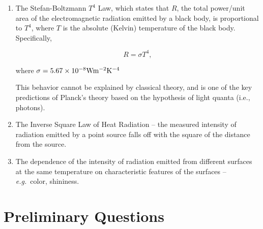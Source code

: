 \documentclass{article}
\begin{document}
\begin{enumerate}
\item The Stefan-Boltzmann $T^4$ Law, which states
that $R$, the total power/unit area of the electromagnetic radiation
emitted by a black body, is proportional to $T^4$, where
$T$ is the absolute (Kelvin) temperature of the black body. Specifically,

\begin{equation}
\label{eq:stephan-boltzman}
R = \sigma T^4, 
 \end{equation}

where $\sigma = 5.67 \times 10^{-8 } {\rm W} {\rm m}^{-2} {\rm K}^{-4}$

This behavior cannot be explained by classical theory, and is one of the
key predictions of Planck's theory based on the
hypothesis of light quanta (i.e., photons).


\item The Inverse Square Law of Heat Radiation -- the measured intensity
of radiation emitted by a point source falls off with the square of the distance from the
source.




\item The dependence of the intensity of radiation emitted from
different surfaces at the same temperature on characteristic features of the surfaces -- {\em e.g.}\ color, shininess.
\end{enumerate}

\section{Preliminary Questions}

\end{document}
